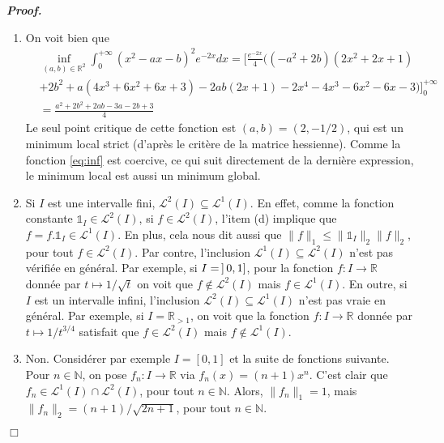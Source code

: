\documentclass[11pt,a4paper]{article}
\newcommand{\NN}{\mathbb{N}}
\newcommand{\RR}{\mathbb{R}}
\newenvironment{preuve}[1][]
{\vskip 2mm  \noindent\emph{\bf Proof#1. }}{$\Box$ \vskip 2mm}
\let\leq\leqslant
\begin{document}
\begin{preuve}
\begin{enumerate}
			\item On voit bien que 
			\begin{equation}
			\label{eq:inf}
			\begin{split}
			&\inf_{(a,b)\in\RR^2}\int_0^{+\infty}(x^2-ax-b)^2e^{-2x}dx = \bigg[ \frac{e^{-2x}}{4} \bigg( (-a^{2}+2b) (2 x^{2}+2x+1) 
			\\
			&+ 2 b^{2} + a (4 x^{3} + 6 x^{2} + 6 x + 3) -2 a b (2 x + 1) -2x^{4} - 4 x^{3} - 6 x^{2} - 6 x - 3 \bigg) \bigg]_{0}^{+\infty} 
			\\
			&= \frac{a^{2} + 2 b^{2} + 2 ab - 3 a - 2 b + 3}{4} 
			\end{split}
			\end{equation}        
			Le seul point critique de cette fonction est $(a,b) = (2,-1/2)$, qui est un minimum local strict (d'après le critère de la matrice hessienne). 
			Comme la fonction \eqref{eq:inf} est coercive, ce qui suit directement de la dernière expression, le minimum local est aussi un minimum global. 
			
			\item Si $I$ est une intervalle fini, $\mathscr{L}^2(I) \subseteq \mathscr{L}^{1}(I)$. 
			En effet, comme la fonction constante $\mathbb{1}_{I} \in \mathscr{L}^2(I)$, si $f \in \mathscr{L}^2(I)$, l'item (d) implique que 
			$f = f.\mathbb{1}_{I} \in \mathscr{L}^{1}(I)$. 
			En plus, cela nous dit aussi que $\| f \|_{1} \leq \| \mathbb{1}_{I} \|_{2} \| f \|_{2}$, pour tout $f \in \mathscr{L}^2(I)$. 
			Par contre, l'inclusion $\mathscr{L}^{1}(I) \subseteq \mathscr{L}^{2}(I)$ n'est pas vérifiée en général. 
			Par exemple, si $I= \hskip 0.6mm ] \hskip 0.6mm 0 ,1]$, pour la fonction $f : I \rightarrow \RR$ donnée par $t \mapsto 1/\sqrt{t}$ 
			on voit que $f \notin \mathscr{L}^2(I)$ mais $f \in \mathscr{L}^{1}(I)$. 
			En outre, si $I$ est un intervalle infini, l'inclusion $\mathscr{L}^2(I) \subseteq \mathscr{L}^{1}(I)$ n'est pas vraie en général. 
			Par exemple, si $I = \RR_{> 1}$, on voit que la fonction $f : I \rightarrow \RR$ donnée par $t \mapsto 1/t^{3/4}$ 
			satisfait que $f \in \mathscr{L}^2(I)$ mais $f \notin \mathscr{L}^{1}(I)$. 
			
			\item Non. 
			Considérer par exemple $I = [0,1]$ et la suite de fonctions suivante. 
			Pour $n \in \NN$, on pose $f_{n} : I \rightarrow \RR$ via $f_{n}(x) = (n+1) x^{n}$. 
			C'est clair que $f_{n} \in \mathscr{L}^1(I)\cap \mathscr{L}^2(I)$, pour tout $n \in \NN$. 
			Alors, $\| f_{n} \|_{1} = 1$, mais $\| f_{n} \|_{2} = (n+1)/\sqrt{2n+1}$, pour tout $n \in \NN$. 
		\end{enumerate}
	\end{preuve}
\end{document}
